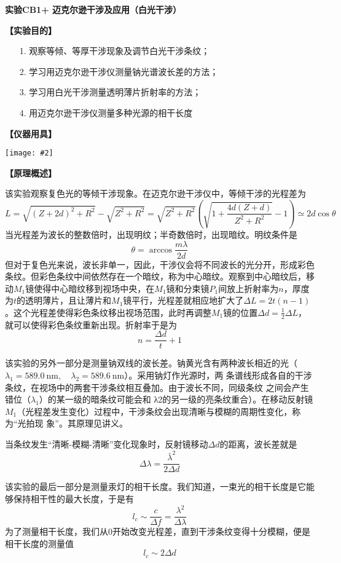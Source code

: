 \documentclass[11pt,a4paper]{ctexart}
\newcommand{\ExpeName}{实验CB1+ 迈克尔逊干涉及应用（白光干涉）}
\newcommand{\cpic}[2]{
\begin{center}
\texttt{[image: \#2]}
\end{center}
}
\newcommand{\beq}{\begin{equation}}
\newcommand{\eeq}{\end{equation}}
\begin{document}
\newpage%
\begin{center}
\LARGE{\textbf{\ExpeName}}
\end{center}
\textbf{【实验目的】}
\begin{enumerate}
 \item[1.] 观察等倾、等厚干涉现象及调节白光干涉条纹；
 \item[2.] 学习用迈克尔逊干涉仪测量钠光谱波长差的方法；
 \item[3.] 学习用白光干涉测量透明薄片折射率的方法；
 \item[4.] 用迈克尔逊干涉仪测量多种光源的相干长度
\end{enumerate}
\textbf{【仪器用具】}
\cpic{0.3}{t1}
\textbf{【原理概述】}\par
该实验观察复色光的等倾干涉现象。在迈克尔逊干涉仪中，等倾干涉的光程差为
\beq
L = \sqrt{(Z+2d)^2 + R^2} - \sqrt{Z^2 + R^2} = \sqrt{Z^2 + R^2}(\sqrt{1+\frac{4d(Z+d)}{Z^2 + R^2}} - 1) \simeq 2d\cos \theta
\eeq
当光程差为波长的整数倍时，出现明纹；半奇数倍时，出现暗纹。明纹条件是
\beq
\theta = \arccos \frac{m \lambda}{2d}
\eeq
但对于复色光来说，波长非单一，因此，干涉仪会将不同波长的光分开，形成彩色条纹。但彩色条纹中间依然存在一个暗纹，称为中心暗纹。观察到中心暗纹后，移动$M_1$镜使得中心暗纹移到视场中央，在$M_1$镜和分束镜$P_1$间放上折射率为$n$，厚度为$t$的透明薄片，且让薄片和$M_1$镜平行，光程差就相应地扩大了$\Delta L = 2t(n-1)$。这个光程差使得彩色条纹移出视场范围，此时再调整$M_1$镜的位置$\Delta d = \frac{1}{2} \Delta L$，就可以使得彩色条纹重新出现。折射率于是为
\beq
n = \frac{\Delta d}{t} + 1
\eeq
\par
该实验的另外一部分是测量钠双线的波长差。钠黄光含有两种波长相近的光（$\lambda_{1}=589.0 \mathrm{\ nm}, \quad \lambda_{2}=589.6 \mathrm{\ nm}$）。采用钠灯作光源时，两
条谱线形成各自的干涉条纹，在视场中的两套干涉条纹相互叠加。由于波长不同，同级条纹
之间会产生错位（$\lambda_1$）的某一级的暗条纹可能会和 λ2的另一级的亮条纹重合）。在移动反射镜$M_1$（光程差发生变化）过程中，干涉条纹会出现清晰与模糊的周期性变化，称为“光拍现
象”。其原理见讲义。\par
当条纹发生“清晰-模糊-清晰”变化现象时，反射镜移动$\Delta d$的距离，波长差就是
\beq
\Delta \lambda = \frac{\bar{\lambda}^2}{2\Delta d}
\eeq
\par
该实验的最后一部分是测量汞灯的相干长度。我们知道，一束光的相干长度是它能够保持相干性的最大长度，于是有
\beq
l_c \sim \frac{c}{\Delta f} = \frac{\lambda^2}{\Delta \lambda}
\eeq
为了测量相干长度，我们从0开始改变光程差，直到干涉条纹变得十分模糊，便是相干长度的测量值
\beq
l_c \sim 2\Delta d
\eeq
\end{document}
